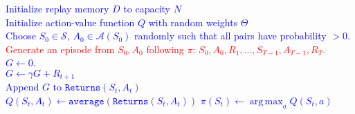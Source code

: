 \documentclass{standalone}
\DeclareMathOperator*{\argmax}{arg\,max}
\begin{document}
\pagestyle{empty}
\begin{algorithm}[H]
  \textcolor{blue}{Initialize replay memory $D$ to capacity $N$\\
  Initialize action-value function $Q$ with random weights $\Theta$} \\
 {
  \textcolor{blue}{Choose $S_0 \in \mathcal S$, $A_0 \in \mathcal A(S_0)$ randomly such that all   pairs have probability $>0$.} \\
  \textcolor{red}{Generate an episode from $S_0, A_0$ following $\pi$: $S_0, A_0, R_1, \ldots,   S_{T-1}, A_{T-1}, R_T$.}\\
  \textcolor{blue}{$G \gets 0$.}\\
   {
    \textcolor{blue}{$G \gets \gamma G + R_{t+1}$ \\
     {
Append $G$ to $\texttt{Returns}(S_t, A_t)$ \\
$Q(S_t, A_t) \gets \texttt{average}(\texttt{Returns}(S_t, A_t))$ 
$\pi(S_t) \gets \argmax_a Q(S_t, a)$ }
    }
  }
}
\end{algorithm}
\end{document}
